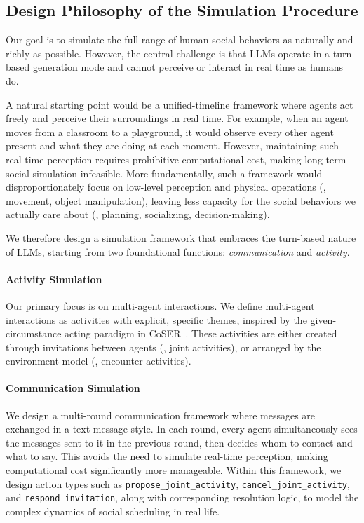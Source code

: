 \subsection{Design Philosophy of the Simulation Procedure}
\label{sec:appendix_design_philosophy}

Our goal is to simulate the full range of human social behaviors as naturally and richly as possible.
However, the central challenge is that LLMs operate in a turn-based generation mode and cannot perceive or interact in real time as humans do.

A natural starting point would be a unified-timeline framework where agents act freely and perceive their surroundings in real time.
For example, when an agent moves from a classroom to a playground, it would observe every other agent present and what they are doing at each moment.
However, maintaining such real-time perception requires prohibitive computational cost, making long-term social simulation infeasible.
More fundamentally, such a framework would disproportionately focus on low-level perception and physical operations (\eg, movement, object manipulation), leaving less capacity for the social behaviors we actually care about (\eg, planning, socializing, decision-making).

We therefore design a simulation framework that embraces the turn-based nature of LLMs, starting from two foundational functions: \textit{communication} and \textit{activity}.

\paragraph{Activity Simulation}
Our primary focus is on multi-agent interactions.
We define multi-agent interactions as activities with explicit, specific themes, inspired by the given-circumstance acting paradigm in CoSER~\citep{wang2025coser}.
These activities are either created through invitations between agents (\ie, joint activities), or  arranged by the environment model (\ie, encounter activities).

\paragraph{Communication Simulation}
We design a multi-round communication framework where messages are exchanged in a text-message style.
In each round, every agent simultaneously sees the messages sent to it in the previous round, then decides whom to contact and what to say.
This avoids the need to simulate real-time perception, making computational cost significantly more manageable.
Within this framework, we design action types such as \texttt{propose\_joint\_activity}, \texttt{cancel\_joint\_activity}, and \texttt{respond\_invitation}, along with corresponding resolution logic, to model the complex dynamics of social scheduling in real life.

